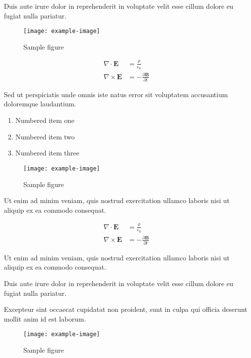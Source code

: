 \documentclass{article}
\begin{document}
Duis aute irure dolor in reprehenderit in voluptate velit esse cillum dolore eu fugiat nulla pariatur.

\begin{figure}[h]
    \centering
    \texttt{[image: example-image]}
    \caption{Sample figure}
    \label{fig:sample}
\end{figure}

\begin{align}
    \nabla \cdot \mathbf{E} &= \frac{\rho}{\epsilon_0} \\
    \nabla \times \mathbf{E} &= -\frac{\partial \mathbf{B}}{\partial t}
\end{align}

Sed ut perspiciatis unde omnis iste natus error sit voluptatem accusantium doloremque laudantium.

\begin{enumerate}
\item Numbered item one
\item Numbered item two
\item Numbered item three
\end{enumerate}

\begin{figure}[h]
    \centering
    \texttt{[image: example-image]}
    \caption{Sample figure}
    \label{fig:sample}
\end{figure}

Ut enim ad minim veniam, quis nostrud exercitation ullamco laboris nisi ut aliquip ex ea commodo consequat.

\begin{align}
    \nabla \cdot \mathbf{E} &= \frac{\rho}{\epsilon_0} \\
    \nabla \times \mathbf{E} &= -\frac{\partial \mathbf{B}}{\partial t}
\end{align}

Ut enim ad minim veniam, quis nostrud exercitation ullamco laboris nisi ut aliquip ex ea commodo consequat.

Duis aute irure dolor in reprehenderit in voluptate velit esse cillum dolore eu fugiat nulla pariatur.

Excepteur sint occaecat cupidatat non proident, sunt in culpa qui officia deserunt mollit anim id est laborum.

\begin{figure}[h]
    \centering
    \texttt{[image: example-image]}
    \caption{Sample figure}
    \label{fig:sample}
\end{figure}
\end{document}
